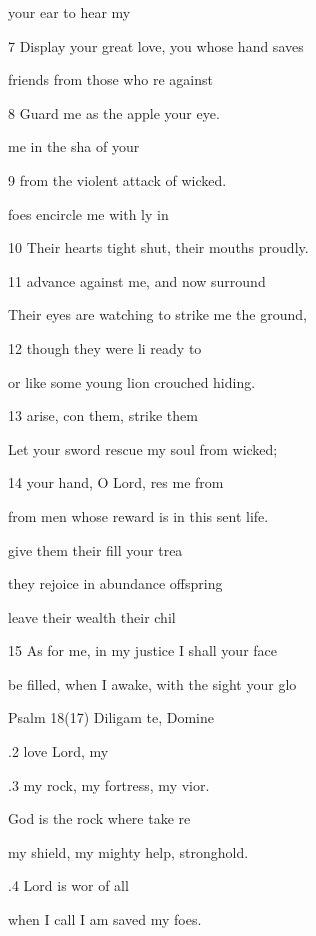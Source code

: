  your ear to  hear my  

7 Display your great love, you whose  hand saves 

 friends from those who re against  

8 Guard me as the apple  your eye. 

 me in the sha of your  

9 from the violent attack of  wicked. 

 foes encircle me with ly in 

10 Their hearts tight shut, their mouths  proudly. 

11  advance against me, and now  surround  

Their eyes are watching to strike me  the ground, 

12  though they were li ready to  

or like some young lion crouched  hiding. 

13  arise, con them, strike them  

Let your sword rescue my soul from  wicked; 

14  your hand, O Lord, res me from  

from men whose reward is in this sent life. 

 give them their fill  your trea 

they rejoice in abundance  offspring 

 leave their wealth  their chil 

15 As for me, in my justice I shall  your face 

 be filled, when I awake, with the sight  your glo 

Psalm 18(17) Diligam te, Domine 


.2  love  Lord, my  

.3 my rock, my fortress, my vior. 

 God is the rock where  take re 

my shield, my mighty help,  stronghold. 

.4  Lord is wor of all  

when I call I am saved  my foes. 

